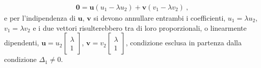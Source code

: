 \documentclass[letterpaper,10pt,italian]{jupyterBook}
\begin{document}
\begin{itemize}
\begin{equation*}
\begin{split}\mathbf{0} = \mathbf{u}\left( u_1 - \lambda u_2\right) + \mathbf{v} \left( v_1 - \lambda v_2 \right) \ ,\end{split}
\end{equation*}
\sphinxAtStartPar
e \sphinxhyphen{} per l’indipendenza di \(\mathbf{u}\), \(\mathbf{v}\) \sphinxhyphen{} si devono annullare entrambi i coefficienti, \(u_1 = \lambda u_2\), \(v_1 = \lambda v_2\) e i due vettori risulterebbero tra di loro proporzionali, o linearmente dipendenti, \(\mathbf{u} = u_2 \begin{bmatrix} \lambda \\ 1 \end{bmatrix}\), \(\mathbf{v} = v_2 \begin{bmatrix} \lambda \\ 1 \end{bmatrix}\), condizione esclusa in partenza dalla condizione \(\Delta_1 \ne 0\).

\end{itemize}
\end{document}
